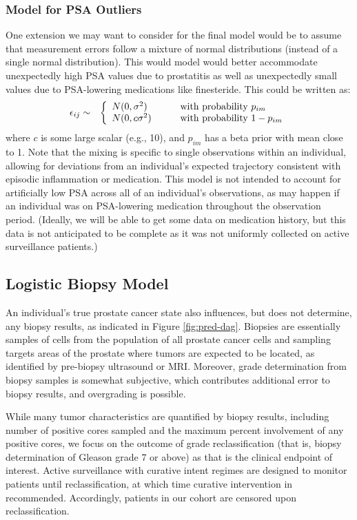 \documentclass[12pt, letterpaper]{article}
\newcommand{\beas}{\begin{eqnarray*}}
\newcommand{\eeas}{\end{eqnarray*}}
\begin{document}
\subsubsection{Model for PSA Outliers}
One extension we may want to consider for the final model would be to assume that measurement errors follow a mixture of normal distributions (instead of a single normal distribution). This would model would better accommodate unexpectedly high PSA values due to prostatitis as well as unexpectedly small values due to PSA-lowering medications like finesteride. This could be written as:
\beas
\epsilon_{ij} &\sim&
\left\{
\begin{array}{l l}
N(0,\sigma^2) & \qquad \text{with probability } p_{im} \\
N(0,c\sigma^2) & \qquad \text{with probability } 1-p_{im}\\
\end{array} \right.
\eeas
where $c$ is some large scalar (e.g., 10), and $p_{im}$ has a beta prior with mean close to 1. Note that the mixing is specific to single observations within an individual, allowing for deviations from an individual's expected trajectory consistent with episodic inflammation or medication. This model is not intended to account for artificially low PSA across all of an individual's observations, as may happen if an individual was on PSA-lowering medication throughout the observation period. (Ideally, we will be able to get some data on medication history, but this data is not anticipated to be complete as it was not uniformly collected on active surveillance patients.)

\subsection{Logistic Biopsy Model}
An individual's true prostate cancer state also influences, but does not determine, any biopsy results, as indicated in Figure \ref{fig:pred-dag}. Biopsies are essentially samples of cells from the population of all prostate cancer cells and sampling targets areas of the prostate where tumors are expected to be located, as identified by pre-biopsy ultrasound or MRI. Moreover, grade determination from biopsy samples is somewhat subjective, which contributes additional error to biopsy results, and overgrading is possible. 

While many tumor characteristics are quantified by biopsy results, including number of positive cores sampled and the maximum percent involvement of any positive cores, we focus on the outcome of grade reclassification (that is, biopsy determination of Gleason grade 7 or above) as that is the clinical endpoint of interest. Active surveillance with curative intent regimes are designed to monitor patients until reclassification, at which time curative intervention in recommended. Accordingly, patients in our cohort are censored upon reclassification.
\end{document}
